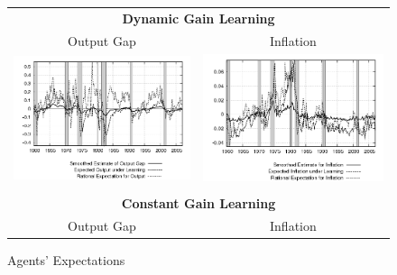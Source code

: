\documentclass[12pt]{article}
\begin{document}
\begin{figure}[ht]
\caption{Agents' Expectations}\label{fg:exp}
\begin{center}\hspace*{-0.65in}
\begin{tabular}{cc}
\multicolumn{2}{c}{\textbf{Dynamic Gain Learning}} \\
Output Gap & Inflation \\
\includegraphics[scale=0.5]{results_dg8_wlsinit/output_expre.png} & \includegraphics[scale=0.5]{results_dg8_wlsinit/inflation_expre.png} \\\\
\multicolumn{2}{c}{\textbf{Constant Gain Learning}} \\
Output Gap & Inflation \\

\end{tabular}
\end{center}
\end{figure}
\end{document}
